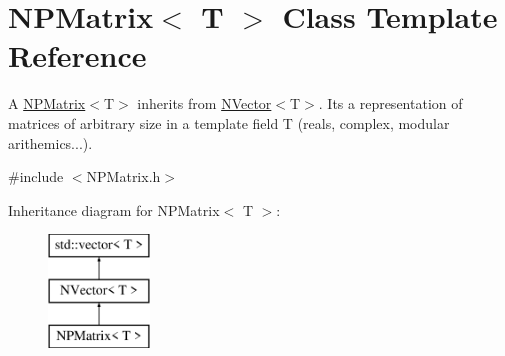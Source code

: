 \hypertarget{class_n_p_matrix}{}\section{N\+P\+Matrix$<$ T $>$ Class Template Reference}
\label{class_n_p_matrix}


A {\ttfamily \mbox{\hyperlink{class_n_p_matrix}{N\+P\+Matrix}}$<$T$>$} inherits from {\ttfamily \mbox{\hyperlink{class_n_vector}{N\+Vector}}$<$T$>$}. It\textquotesingle{}s a representation of matrices of arbitrary size in a template field {\ttfamily T} (reals, complex, modular arithemics...).  




{\ttfamily \#include $<$N\+P\+Matrix.\+h$>$}

Inheritance diagram for N\+P\+Matrix$<$ T $>$\+:\begin{figure}[H]
\begin{center}
\leavevmode
\includegraphics[height=3.000000cm]{class_n_p_matrix}
\end{center}
\end{figure}
